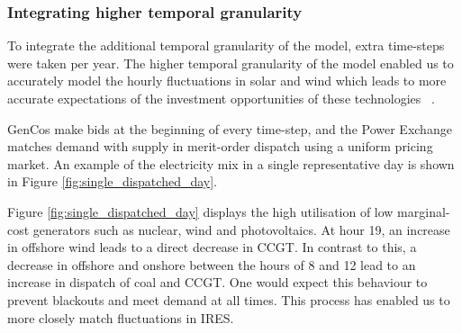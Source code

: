 %
%
%
%


\subsubsection{Integrating higher temporal granularity}

To integrate the additional temporal granularity of the model, extra time-steps were taken per year. The higher temporal granularity of the model enabled us to accurately model the hourly fluctuations in solar and wind which leads to more accurate expectations of the investment opportunities of these technologies ~\cite{Ludig2011,Haydt2011}.

GenCos make bids at the beginning of every time-step, and the Power Exchange matches demand with supply in merit-order dispatch using a uniform pricing market. An example of the electricity mix in a single representative day is shown in Figure \ref{fig:single_dispatched_day}. 

%

Figure \ref{fig:single_dispatched_day} displays the high utilisation of low marginal-cost generators such as nuclear, wind and photovoltaics. At hour 19, an increase in offshore wind leads to a direct decrease in CCGT. In contrast to this, a decrease in offshore and onshore between the hours of 8 and 12 lead to an increase in dispatch of coal and CCGT. One would expect this behaviour to prevent blackouts and meet demand at all times. This process has enabled us to more closely match fluctuations in IRES.


